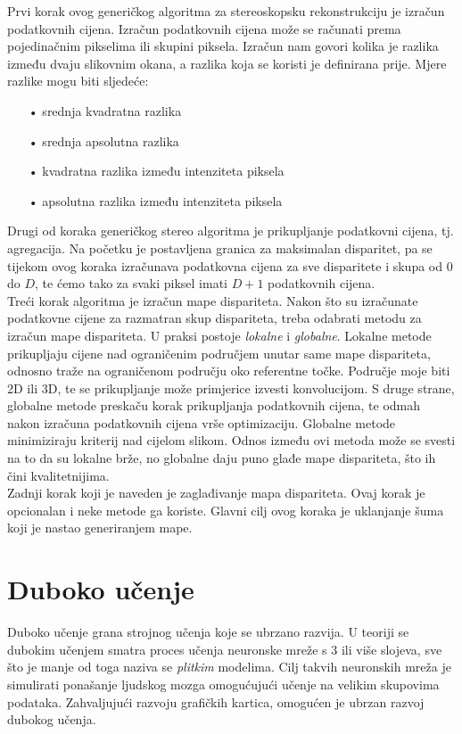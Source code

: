 \documentclass[times, utf8, zavrsni, numeric]{fer}
\begin{document}
Prvi korak ovog generičkog algoritma za stereoskopsku rekonstrukciju je izračun podatkovnih cijena. Izračun podatkovnih cijena može se računati prema pojedinačnim pikselima ili skupini piksela.  Izračun nam govori kolika je razlika između dvaju slikovnim okana, a razlika koja se koristi je definirana prije. Mjere razlike mogu biti sljedeće:
\begin{itemize}
\item[•] srednja kvadratna razlika
\item[•] srednja apsolutna razlika
\item[•] kvadratna razlika između intenziteta piksela
\item[•] apsolutna razlika između intenziteta piksela
\end{itemize}

\newpage
Drugi od koraka generičkog stereo algoritma je prikupljanje podatkovni cijena, tj. agregacija.  Na početku je postavljena granica za maksimalan disparitet, pa se tijekom ovog koraka izračunava podatkovna cijena za sve disparitete i skupa  od $0$ do $D$, te ćemo tako za svaki piksel imati $D+1$ podatkovnih cijena.\\
Treći korak algoritma je izračun mape dispariteta. Nakon što su izračunate podatkovne cijene za razmatran skup dispariteta, treba odabrati metodu za izračun mape dispariteta. U praksi postoje \textit{lokalne} i \textit{globalne}. Lokalne metode prikupljaju cijene nad ograničenim područjem unutar same mape dispariteta, odnosno traže na ograničenom području oko referentne točke. Područje moje biti 2D ili 3D, te se prikupljanje može primjerice izvesti konvolucijom. S druge strane, globalne metode  preskaču korak prikupljanja podatkovnih cijena, te odmah nakon izračuna podatkovnih cijena vrše optimizaciju. Globalne metode minimiziraju kriterij nad cijelom slikom. Odnos između ovi metoda može se svesti na to da su lokalne brže, no globalne daju puno glađe mape dispariteta, što ih čini kvalitetnijima.\\
Zadnji korak koji je naveden je zaglađivanje mapa dispariteta. Ovaj korak je opcionalan i neke metode ga koriste. Glavni cilj ovog koraka je uklanjanje šuma koji je nastao generiranjem mape. 
\chapter{Duboko učenje}
Duboko učenje grana strojnog učenja koje se ubrzano razvija. U teoriji se dubokim učenjem smatra proces učenja neuronske mreže s 3 ili više slojeva, sve što je manje od toga naziva se \textit{plitkim} modelima. Cilj takvih neuronskih mreža je simulirati ponašanje ljudskog mozga omogućujući učenje na velikim skupovima podataka. Zahvaljujući razvoju grafičkih kartica, omogućen je ubrzan razvoj dubokog učenja.
\end{document}
